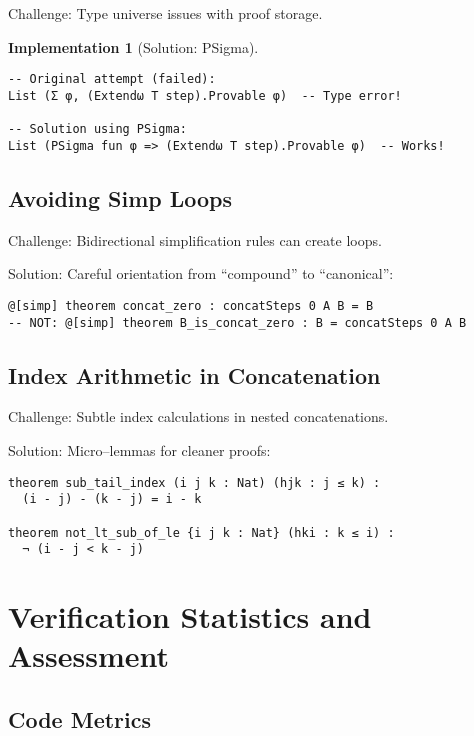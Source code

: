 \documentclass[11pt]{article}
\theoremstyle{definition}
\newtheorem{implementation}[theorem]{Implementation}
\theoremstyle{remark}
\begin{document}
Challenge: Type universe issues with proof storage.

\begin{implementation}[Solution: PSigma]
\begin{lstlisting}[language={}]
-- Original attempt (failed):
List (Σ φ, (Extendω T step).Provable φ)  -- Type error!

-- Solution using PSigma:
List (PSigma fun φ => (Extendω T step).Provable φ)  -- Works!
\end{lstlisting}
\end{implementation}

\subsection{Avoiding Simp Loops}

Challenge: Bidirectional simplification rules can create loops.

Solution: Careful orientation from ``compound'' to ``canonical'':
\begin{lstlisting}[language={}]
@[simp] theorem concat_zero : concatSteps 0 A B = B
-- NOT: @[simp] theorem B_is_concat_zero : B = concatSteps 0 A B
\end{lstlisting}

\subsection{Index Arithmetic in Concatenation}

Challenge: Subtle index calculations in nested concatenations.

Solution: Micro--lemmas for cleaner proofs:
\begin{lstlisting}[language={}]
theorem sub_tail_index (i j k : Nat) (hjk : j ≤ k) :
  (i - j) - (k - j) = i - k

theorem not_lt_sub_of_le {i j k : Nat} (hki : k ≤ i) :
  ¬ (i - j < k - j)
\end{lstlisting}

\section{Verification Statistics and Assessment}

\subsection{Code Metrics}
\end{document}
